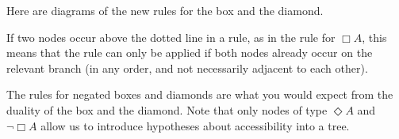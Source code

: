 Here are diagrams of the new rules for the box and the diamond.

\bigskip

\begin{minipage}{0.24\textwidth} \centering
{}
\end{minipage}
\begin{minipage}{0.24\textwidth}\centering
{}
\end{minipage}
\begin{minipage}{0.24\textwidth}\centering
{}
\end{minipage}
\begin{minipage}{0.24\textwidth} \centering
{}
\end{minipage}

\bigskip\noindent%
If two nodes occur above the dotted line in a rule, as in the rule for $\Box A$,
this means that the rule can only be applied if both nodes already occur on the
relevant branch (in any order, and not necessarily adjacent to each other).

The rules for negated boxes and diamonds are what you would expect from
the duality of the box and the diamond. Note that only nodes of type
$\Diamond A$ and $\neg \Box A$ allow us to introduce hypotheses about
accessibility into a tree.

